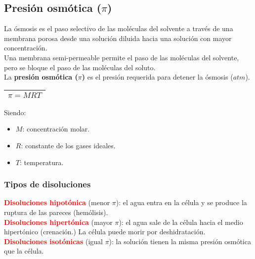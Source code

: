     \subsection{Presión osmótica ($\pi$)}
        \sangria{} La ósmosis es el paso selectivo de las moléculas del solvente a través de una membrana porosa desde una solución diluida hacia una solución con mayor concentración. \\
        \sangria{} Una membrana semi-permeable permite el paso de las moléculas del solvente, pero se bloque el paso de las moléculas del soluto. \\
        \sangria{} La \textbf{presión osmótica ($\pi$)} es el presión requerida para detener la ósmosis ($atm$).
        \begin{center}
            \begin{tabular}{|m{5cm}|}
                \toprule
                \multicolumn{1}{|c|}{$\pi = MRT$} \\
                \bottomrule
            \end{tabular}
        \end{center}
        Siendo:
        \begin{itemize}
            \item $M$: concentración molar.
            \item $R$: constante de los gases ideales.
            \item $T$: temperatura.
        \end{itemize}
        \subsubsection{Tipos de disoluciones}
        \textcolor{red}{\textbf{Disoluciones hipotónica}} (menor $\pi$): el agua entra en la célula y se produce la ruptura de las pareces (hemólisis). \\
        \textcolor{red}{\textbf{Disoluciones hipertónica}} (mayor $\pi$): el agua sale de la célula hacia el medio hipertónico (crenación.) La célula puede morir por deshidratación. \\ 
        \textcolor{red}{\textbf{Disoluciones isotónicas}} (igual $\pi$): la solución tienen la misma presión osmótica que la célula. \\
